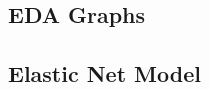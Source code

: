 \documentclass[]{article}
\begin{document}
\hypertarget{eda-graphs}{%
\subsection{EDA Graphs}\label{eda-graphs}}

\hypertarget{elastic-net-model}{%
\subsection{Elastic Net Model}\label{elastic-net-model}}
\end{document}
